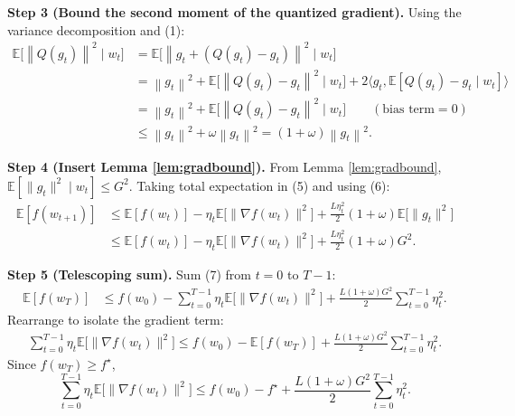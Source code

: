 \documentclass[11pt]{article}
\newcommand{\E}{\mathbb{E}}
\newcommand{\norm}[1]{\left\lVert#1\right\rVert}
\newcommand{\ip}[2]{\langle #1, #2\rangle}
\begin{document}
\noindent\textbf{Step 3 (Bound the second moment of the quantized gradient).}  
Using the variance decomposition and (1):
\begin{align}
\E\!\bigl[\norm{Q(g_t)}^{2}\mid w_t\bigr]
&= \E\!\bigl[\norm{g_t + (Q(g_t)-g_t)}^{2}\mid w_t\bigr]\nonumber\\
&= \norm{g_t}^{2}
   + \E\!\bigl[\norm{Q(g_t)-g_t}^{2}\mid w_t\bigr]
   + 2\ip{g_t}{\E[Q(g_t)-g_t\mid w_t]}\nonumber\\
&= \norm{g_t}^{2}
   + \E\!\bigl[\norm{Q(g_t)-g_t}^{2}\mid w_t\bigr]\qquad(\text{bias term}=0)\nonumber\\
&\le \norm{g_t}^{2} + \omega \norm{g_t}^{2}
   = (1+\omega)\norm{g_t}^{2}.
\tag{6}
\end{align}
\medskip

\noindent\textbf{Step 4 (Insert Lemma \ref{lem:gradbound}).}  
From Lemma \ref{lem:gradbound}, $\E[\|g_t\|^{2}\mid w_t]\le G^{2}$.  Taking total expectation in (5) and using (6):
\begin{align}
\E[f(w_{t+1})]
&\le \E[f(w_t)] - \eta_t \E\!\bigl[\|\nabla f(w_t)\|^{2}\bigr]
   + \frac{L\eta_t^{2}}{2}(1+\omega) \E\!\bigl[\|g_t\|^{2}\bigr]\nonumber\\
&\le \E[f(w_t)] - \eta_t \E\!\bigl[\|\nabla f(w_t)\|^{2}\bigr]
   + \frac{L\eta_t^{2}}{2}(1+\omega) G^{2}.
\tag{7}
\end{align}
\medskip

\noindent\textbf{Step 5 (Telescoping sum).}  
Sum (7) from $t=0$ to $T-1$:
\begin{align}
\E[f(w_T)] 
&\le f(w_0) - \sum_{t=0}^{T-1}\eta_t \E\!\bigl[\|\nabla f(w_t)\|^{2}\bigr]
   + \frac{L(1+\omega)G^{2}}{2}\sum_{t=0}^{T-1}\eta_t^{2}.
\tag{8}
\end{align}
Rearrange to isolate the gradient term:
\begin{align}
\sum_{t=0}^{T-1}\eta_t \E\!\bigl[\|\nabla f(w_t)\|^{2}\bigr]
\le f(w_0)-\E[f(w_T)] + \frac{L(1+\omega)G^{2}}{2}\sum_{t=0}^{T-1}\eta_t^{2}.
\tag{9}
\end{align}
Since $f(w_T)\ge f^{\star}$,
\[
\sum_{t=0}^{T-1}\eta_t \E\!\bigl[\|\nabla f(w_t)\|^{2}\bigr]
\le f(w_0)-f^{\star} + \frac{L(1+\omega)G^{2}}{2}\sum_{t=0}^{T-1}\eta_t^{2}.
\tag{10}
\]
\medskip
\end{document}
